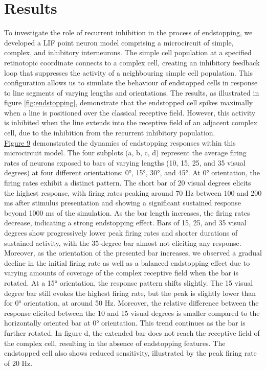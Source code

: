 \documentclass[12pt]{article}
\begin{document}
\section*{Results}
\setlength{\parindent}{24pt}
To investigate the role of recurrent inhibition in the process of endstopping, we developed a LIF point neuron model comprising a microcircuit of simple, complex, and inhibitory interneurons. The simple cell population at a specified retinotopic coordinate connects to a complex cell, creating an inhibitory feedback loop that suppresses the activity of a neighbouring simple cell population. This configuration allows us to simulate the behaviour of endstopped cells in response to line segments of varying lengths and orientations. The results, as illustrated in figure \ref{fig:endstopping}, demonstrate that the endstopped cell spikes maximally when a line is positioned over the classical receptive field. However, this activity is inhibited when the line extends into the receptive field of an adjacent complex cell, due to the inhibition from the recurrent inhibitory population.
\setlength{\parindent}{0pt}
\\
\hyperref[fig:endstopping]{Figure 9} demonstrated the dynamics of endstopping responses within this microcircuit model. The four subplots (a, b, c, d) represent the average firing rates of neurons exposed to bars of varying lengths (10, 15, 25, and 35 visual degrees) at four different orientations: 0°, 15°, 30°, and 45°. At 0° orientation, the firing rates exhibit a distinct pattern. The short bar of 20 visual degrees elicits the highest response, with firing rates peaking around 70 Hz between 100 and 200 ms after stimulus presentation and showing a significant sustained response beyond 1000 ms of the simulation. As the bar length increases, the firing rates decrease, indicating a strong endstopping effect. Bars of 15, 25, and 35 visual degrees show progressively lower peak firing rates and shorter durations of sustained activity, with the 35-degree bar almost not eliciting any response. Moreover, as the orientation of the presented bar increases, we observed a gradual decline in the initial firing rate as well as a balanced endstopping effect due to varying amounts of coverage of the complex receptive field when the bar is rotated. At a 15° orientation, the response pattern shifts slightly. The 15 visual degree bar still evokes the highest firing rate, but the peak is slightly lower than for 0° orientation, at around 50 Hz. Moreover, the relative difference between the response elicited between the 10 and 15 visual degrees is smaller compared to the horizontally oriented bar at 0° orientation. This trend continues as the bar is further rotated. In figure d, the extended bar does not reach the receptive field of the complex cell, resulting in the absence of endstopping features. The endstopped cell also shows reduced sensitivity, illustrated by the peak firing rate of 20 Hz.
\end{document}
